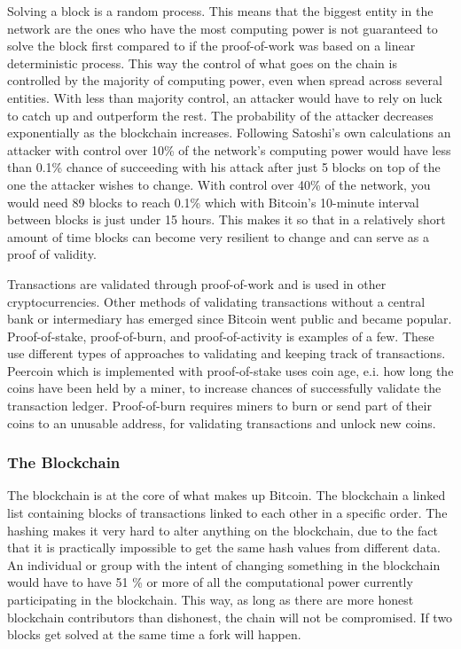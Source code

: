 \documentclass[12pt]{article}
\begin{document}
Solving a block is a random process. This means that the biggest entity in the network are the ones who have the most computing power is not guaranteed to solve the block first compared to if the proof-of-work was based on a linear deterministic process. This way the control of what goes on the chain is controlled by the majority of computing power, even when spread across several entities. With less than majority control, an attacker would have to rely on luck to catch up and outperform the rest. The probability of the attacker decreases exponentially as the blockchain increases. Following Satoshi's own calculations\cite{nakamoto2009bitcoin} an attacker with control over 10\% of the network's computing power would have less than 0.1\% chance of succeeding with his attack after just 5 blocks on top of the one the attacker wishes to change. With control over 40\% of the network, you would need 89 blocks to reach 0.1\% which with Bitcoin's 10-minute interval between blocks is just under 15 hours. This makes it so that in a relatively short amount of time blocks can become very resilient to change and can serve as a proof of validity.

Transactions are validated through proof-of-work and is used in other cryptocurrencies. Other methods of validating transactions without a central bank or intermediary has emerged since Bitcoin went public and became popular. Proof-of-stake, proof-of-burn, and proof-of-activity is examples of a few. These use different types of approaches to validating and keeping track of transactions. Peercoin which is implemented with proof-of-stake uses coin age, e.i. how long the coins have been held by a miner, to increase chances of successfully validate the transaction ledger. Proof-of-burn requires miners to burn or send part of their coins to an unusable address, for validating transactions and unlock new coins. 

\subsubsection{The Blockchain} %

The blockchain is at the core of what makes up Bitcoin. The blockchain a linked list containing blocks of transactions linked to each other in a specific order. The hashing makes it very hard to alter anything on the blockchain, due to the fact that it is practically impossible to get the same hash values from different data. An individual or group with the intent of changing something in the blockchain would have to have 51 \% or more of all the computational power currently participating in the blockchain. This way, as long as there are more honest blockchain contributors than dishonest, the chain will not be compromised. If two blocks get solved at the same time a fork will happen. %
\end{document}
